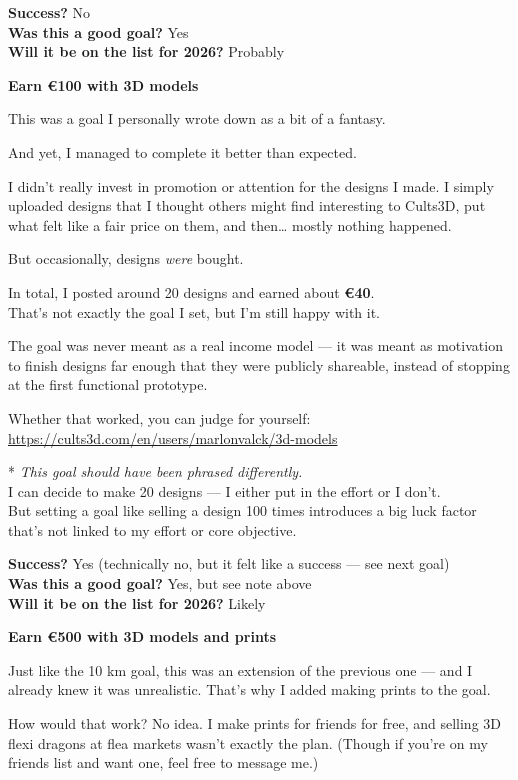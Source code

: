 \documentclass[12pt]{article}
\begin{document}
\textbf{Success?} No\\
\textbf{Was this a good goal?} Yes\\
\textbf{Will it be on the list for 2026?} Probably

\textbf{Earn €100 with 3D models}

This was a goal I personally wrote down as a bit of a fantasy.

And yet, I managed to complete it better than expected.

I didn't really invest in promotion or attention for the designs I made.
I simply uploaded designs that I thought others might find interesting
to Cults3D, put what felt like a fair price on them, and then\ldots{}
mostly nothing happened.

But occasionally, designs \emph{were} bought.

In total, I posted around 20 designs and earned about \textbf{€40}.\\
That's not exactly the goal I set, but I'm still happy with it.

The goal was never meant as a real income model --- it was meant as
motivation to finish designs far enough that they were publicly
shareable, instead of stopping at the first functional prototype.

Whether that worked, you can judge for yourself:\\
\url{https://cults3d.com/en/users/marlonvalck/3d-models}

* \emph{This goal should have been phrased differently.}\\
I can decide to make 20 designs --- I either put in the effort or I
don't.\\
But setting a goal like selling a design 100 times introduces a big luck
factor that's not linked to my effort or core objective.

\textbf{Success?} Yes (technically no, but it felt like a success ---
see next goal)\\
\textbf{Was this a good goal?} Yes, but see note above\\
\textbf{Will it be on the list for 2026?} Likely

\textbf{Earn €500 with 3D models and prints}

Just like the 10 km goal, this was an extension of the previous one ---
and I already knew it was unrealistic. That's why I added making prints
to the goal.

How would that work? No idea. I make prints for friends for free, and
selling 3D flexi dragons at flea markets wasn't exactly the plan.
(Though if you're on my friends list and want one, feel free to message
me.)
\end{document}
